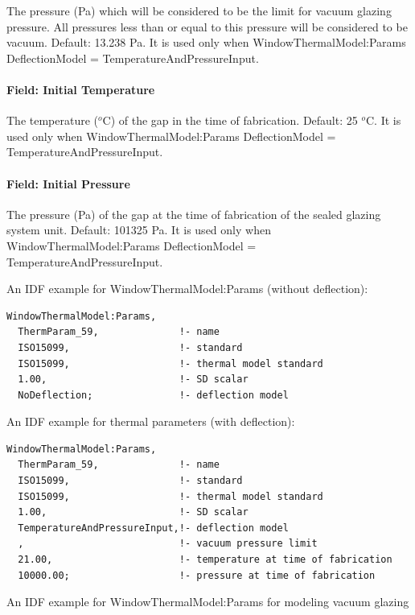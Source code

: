The pressure (Pa) which will be considered to be the limit for vacuum glazing pressure. All pressures less than or equal to this pressure will be considered to be vacuum. Default: 13.238 Pa. It is used only when WindowThermalModel:Params DeflectionModel = TemperatureAndPressureInput.

\paragraph{Field: Initial Temperature}\label{field-initial-temperature}

The temperature (\(^{o}\)C) of the gap in the time of fabrication. Default: 25 \(^{o}\)C. It is used only when WindowThermalModel:Params DeflectionModel = TemperatureAndPressureInput.

\paragraph{Field: Initial Pressure}\label{field-initial-pressure}

The pressure (Pa) of the gap at the time of fabrication of the sealed glazing system unit. Default: 101325 Pa. It is used only when WindowThermalModel:Params DeflectionModel = TemperatureAndPressureInput.

An IDF example for WindowThermalModel:Params (without deflection):

\begin{lstlisting}
WindowThermalModel:Params,
  ThermParam_59,              !- name
  ISO15099,                   !- standard
  ISO15099,                   !- thermal model standard
  1.00,                       !- SD scalar
  NoDeflection;               !- deflection model
\end{lstlisting}

An IDF example for thermal parameters (with deflection):

\begin{lstlisting}
WindowThermalModel:Params,
  ThermParam_59,              !- name
  ISO15099,                   !- standard
  ISO15099,                   !- thermal model standard
  1.00,                       !- SD scalar
  TemperatureAndPressureInput,!- deflection model
  ,                           !- vacuum pressure limit
  21.00,                      !- temperature at time of fabrication
  10000.00;                   !- pressure at time of fabrication
\end{lstlisting}

An IDF example for WindowThermalModel:Params for modeling vacuum glazing

